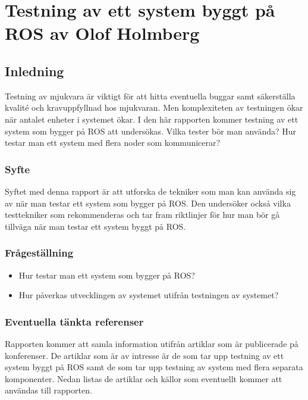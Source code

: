 \chapter{Testning av ett system byggt på ROS av Olof Holmberg}
\label{cha:indiv-report-person}

\section{Inledning}
\label{sec:introduction-person}

Testning av mjukvara är viktigt för att hitta eventuella buggar samt säkerställa kvalité och kravuppfyllnad hos mjukvaran. Men komplexiteten av testningen ökar när antalet enheter i systemet ökar. I den här rapporten kommer testning av ett system som bygger på ROS att undersökas. Vilka tester bör man använda? Hur testar man ett system med flera noder som kommunicerar?

\subsection{Syfte}
\label{sec:purpose-person}

Syftet med denna rapport är att utforska de tekniker som man kan använda sig av när man testar ett system som bygger på ROS. Den undersöker också vilka testtekniker som rekommenderas och tar fram riktlinjer för hur man bör gå tillväga när man testar ett system byggt på ROS.

\subsection{Frågeställning}
\label{sec:issue-person}

\begin{itemize}
	\item Hur testar man ett system som bygger på ROS?
	\item Hur påverkas utvecklingen av systemet utifrån testningen av systemet?
\end{itemize}

\subsection{Eventuella tänkta referenser}

Rapporten kommer att samla information utifrån artiklar som är publicerade på konferenser. De artiklar som är av intresse är de som tar upp testning av ett system byggt på ROS samt de som tar upp testning av system med flera separata komponenter. Nedan listas de artiklar och källor som eventuellt kommer att användas till rapporten.


